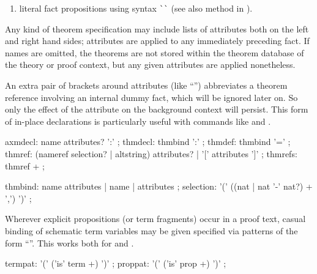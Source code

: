 \begin{isabellebody}
\begin{isamarkuptext}
\begin{enumerate}
  \item literal fact propositions using \mbox{} syntax
  \verb|`|\isa{{\isasymphi}}\verb|`| (see also method
  \mbox{} in ).

  \end{enumerate}

  Any kind of theorem specification may include lists of attributes
  both on the left and right hand sides; attributes are applied to any
  immediately preceding fact.  If names are omitted, the theorems are
  not stored within the theorem database of the theory or proof
  context, but any given attributes are applied nonetheless.

  An extra pair of brackets around attributes (like ``'') abbreviates a theorem reference involving an
  internal dummy fact, which will be ignored later on.  So only the
  effect of the attribute on the background context will persist.
  This form of in-place declarations is particularly useful with
  commands like \mbox{} and \mbox{}.

  \begin{rail}
    axmdecl: name attributes? ':'
    ;
    thmdecl: thmbind ':'
    ;
    thmdef: thmbind '='
    ;
    thmref: (nameref selection? | altstring) attributes? | '[' attributes ']'
    ;
    thmrefs: thmref +
    ;

    thmbind: name attributes | name | attributes
    ;
    selection: '(' ((nat | nat '-' nat?) + ',') ')'
    ;
  \end{rail}%
\end{isamarkuptext}%
\isamarkuptrue%
%
\isamarkuptrue%
%
\begin{isamarkuptext}%
Wherever explicit propositions (or term fragments) occur in a proof
  text, casual binding of schematic term variables may be given
  specified via patterns of the form ``''.  This works both for  and .

  \begin{rail}
    termpat: '(' ('is' term +) ')'
    ;
    proppat: '(' ('is' prop +) ')'
    ;
  \end{rail}


\end{isamarkuptext}
\end{isabellebody}
